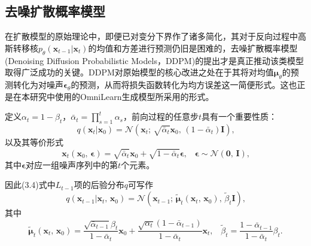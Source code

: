 \subsection{去噪扩散概率模型}
\label{sec:threeptwoptwo}
在扩散模型的原始理论中，即便已对变分下界作了诸多简化，其对于反向过程中高斯转移核$p_{\theta}(\boldsymbol{x}_{t-1} \vert \boldsymbol{x}_t)$的均值和方差进行预测仍旧是困难的，去噪扩散概率模型(Denoising Diffusion Probabilistic Models，DDPM)\cite{ref10}的提出才是真正推动该类模型取得广泛成功的关键。DDPM对原始模型的核心改进之处在于其将对均值$\boldsymbol{\mu}_{\theta}$的预测转化为对噪声$\boldsymbol{\epsilon}_{\theta}$的预测，从而将损失函数转化为均方误差这一简便形式。这也正是在本研究中使用的OmniLearn生成模型所采用的形式。

定义$\alpha_t =1-\beta_t$，$\bar{\alpha}_t =\prod_{s=1}^{t} \alpha_s $，前向过程的任意步$t$具有一个重要性质：
\begin{equation*}
q(\boldsymbol{x}_t \vert \boldsymbol{x}_0)=\mathcal{N}(\boldsymbol{x}_t\text{; } \sqrt{\bar{\alpha}_t} \boldsymbol{x}_0\text{, } (1-\bar{\alpha}_t )\mathbf{I} )\text{,}
\tag{3.5}
\end{equation*}
\noindent 以及其等价形式
\begin{equation*}
\boldsymbol{x}_t(\boldsymbol{x}_0\text{, } \boldsymbol{\epsilon})=\sqrt{\bar{\alpha}_t} \boldsymbol{x}_0 +\sqrt{1-\bar{\alpha}_t } \boldsymbol{\epsilon}\text{,} \quad \boldsymbol{\epsilon} \sim \mathcal{N}(\mathbf{0}\text{, } \mathbf{I})\text{,}
\tag{3.6}
\end{equation*}
\noindent 其中$\boldsymbol{\epsilon}$对应一组噪声序列中的第$t$个元素。

因此(3.4)式中$L_{t-1}$项的后验分布$q$可写作
\begin{equation*}
q(\boldsymbol{x}_{t-1} \vert \boldsymbol{x}_t\text{, } \boldsymbol{x}_0)=\mathcal{N}(\boldsymbol{x}_{t-1}\text{; } \tilde{\boldsymbol{\mu}}_t (\boldsymbol{x}_t\text{, } \boldsymbol{x}_0)\text{, } \tilde{\beta}_t \mathbf{I})\text{,}
\tag{3.7}
\end{equation*}
\noindent 其中
\begin{equation*}
\tilde{\boldsymbol{\mu}}_t (\boldsymbol{x}_t\text{, } \boldsymbol{x}_0) = \frac{\sqrt{\bar{\alpha}_{t-1}} \beta_t}{1-\bar{\alpha}_t} \boldsymbol{x}_0+\frac{\sqrt{\alpha_t} (1-\bar{\alpha}_{t-1} )}{1-\bar{\alpha}_t} \boldsymbol{x}_t\text{,} \quad \tilde{\beta}_t = \frac{1-\bar{\alpha}_{t-1}}{1-\bar{\alpha}_t} \beta_t\text{.}
\tag{3.8}
\end{equation*}

